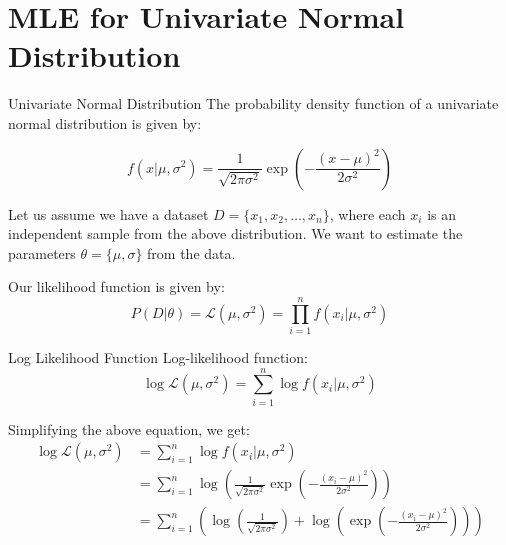 \documentclass[handout]{beamer}
\begin{document}
\section{MLE for Univariate Normal Distribution}

\begin{frame}{Univariate Normal Distribution}
The probability density function of a univariate normal distribution is given by:

\begin{equation}
f(x|\mu, \sigma^2) = \frac{1}{\sqrt{2\pi\sigma^2}}\exp\left(-\frac{(x-\mu)^2}{2\sigma^2}\right)
\end{equation}

Let us assume we have a dataset $D = \{x_1, x_2, \ldots, x_n\}$, where each $x_i$ is an independent sample from the above distribution. 
We want to estimate the parameters $\theta = \{\mu, \sigma\}$ from the data.

Our likelihood function is given by:
\begin{equation}
P(D|\theta) = \mathcal{L}(\mu, \sigma^2) = \prod_{i=1}^n f(x_i|\mu, \sigma^2)
\end{equation}


\end{frame}

\begin{frame}{Log Likelihood Function}
    Log-likelihood function:
    \begin{equation}
        \log \mathcal{L}(\mu, \sigma^2) = \sum_{i=1}^n \log f(x_i|\mu, \sigma^2)
    \end{equation}

    Simplifying the above equation, we get:
    \begin{align*}
        \log \mathcal{L}(\mu, \sigma^2) &= \sum_{i=1}^n \log f(x_i|\mu, \sigma^2) \\
        &= \sum_{i=1}^n \log \left( \frac{1}{\sqrt{2\pi\sigma^2}} \exp \left( -\frac{(x_i-\mu)^2}{2\sigma^2} \right) \right) \\
        &= \sum_{i=1}^n \left( \log \left( \frac{1}{\sqrt{2\pi\sigma^2}} \right) + \log \left( \exp \left( -\frac{(x_i-\mu)^2}{2\sigma^2} \right) \right) \right) \\
        \end{align*}
\end{frame}
\end{document}
